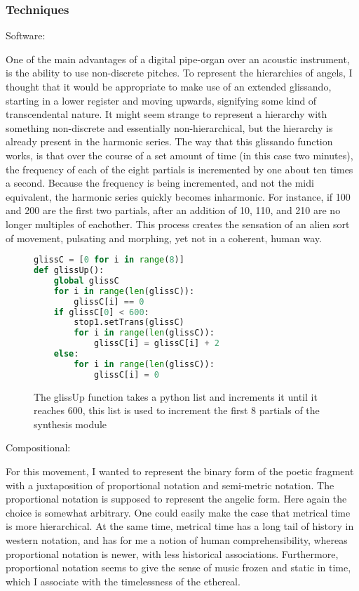\documentclass[12pt,twoside,maitrise]{dms}
\theoremstyle{definition}
\begin{document}
\subsubsection{Techniques}

Software:

One of the main advantages of a digital pipe-organ over an acoustic instrument, is the ability to use non-discrete pitches.
To represent the hierarchies of angels, I thought that it would be appropriate to make use of an extended glissando, starting in a lower register and moving upwards, signifying some kind of transcendental nature.
It might seem strange to represent a hierarchy with something non-discrete and essentially non-hierarchical, but the hierarchy is already present in the harmonic series.
The way that this glissando function works, is that over the course of a set amount of time (in this case two minutes), the frequency of each of the eight partials is incremented by one about ten times a second.
Because the frequency is being incremented, and not the midi equivalent, the harmonic series quickly becomes inharmonic.
For instance, if 100 and 200 are the first two partials, after an addition of 10, 110, and 210 are no longer multiples of eachother.
This process creates the sensation of an alien sort of movement, pulsating and morphing, yet not in a coherent, human way.    
\begin{figure}[H]
\begin{lstlisting}[language=Python]
glissC = [0 for i in range(8)]
def glissUp():
    global glissC
    for i in range(len(glissC)):
        glissC[i] == 0
    if glissC[0] < 600:
        stop1.setTrans(glissC)
        for i in range(len(glissC)):
            glissC[i] = glissC[i] + 2
    else:
        for i in range(len(glissC)):
            glissC[i] = 0
\end{lstlisting}
\caption{The glissUp function takes a python list and increments it until it reaches 600, this list is used to increment the first 8 partials of the synthesis module}
\end{figure}

Compositional:

For this movement, I wanted to represent the binary form of the poetic fragment with a juxtaposition of proportional notation and semi-metric notation.
The proportional notation is supposed to represent the angelic form.
Here again the choice is somewhat arbitrary.
One could easily make the case that metrical time is more hierarchical.
At the same time, metrical time has a long tail of history in western notation, and has for me a notion of human comprehensibility, whereas proportional notation is newer, with less historical associations.
Furthermore, proportional notation seems to give the sense of music frozen and static in time, which I associate with the timelessness of the ethereal.
\end{document}
